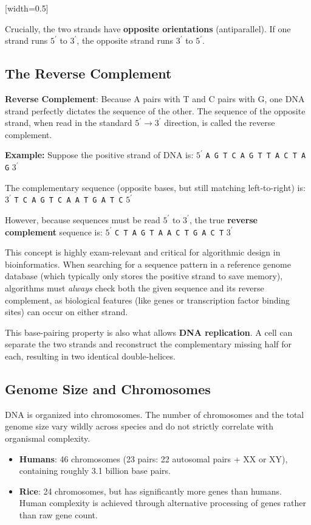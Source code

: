[width=0.5\textwidth]

Crucially, the two strands have \textbf{opposite orientations} (antiparallel). If one strand runs $5^{\prime}$ to $3^{\prime}$, the opposite strand runs $3^{\prime}$ to $5^{\prime}$. 

\subsection{The Reverse Complement}
\begin{important}
  \textbf{Reverse Complement}: Because A pairs with T and C pairs with G, one DNA strand perfectly dictates the sequence of the other. The sequence of the opposite strand, when read in the standard $5^{\prime} \to 3^{\prime}$ direction, is called the reverse complement.
\end{important}

\textbf{Example:}
Suppose the positive strand of DNA is:
$5^{\prime}$ \texttt{A G T C A G T T A C T A G} $3^{\prime}$

The complementary sequence (opposite bases, but still matching left-to-right) is:
$3^{\prime}$ \texttt{T C A G T C A A T G A T C} $5^{\prime}$

However, because sequences must be read $5^{\prime}$ to $3^{\prime}$, the true \textbf{reverse complement} sequence is:
$5^{\prime}$ \texttt{C T A G T A A C T G A C T} $3^{\prime}$

\sta This concept is highly exam-relevant and critical for algorithmic design in bioinformatics. When searching for a sequence pattern in a reference genome database (which typically only stores the positive strand to save memory), algorithms must \textit{always} check both the given sequence and its reverse complement, as biological features (like genes or transcription factor binding sites) can occur on either strand.

This base-pairing property is also what allows \textbf{DNA replication}. A cell can separate the two strands and reconstruct the complementary missing half for each, resulting in two identical double-helices.

\subsection{Genome Size and Chromosomes}
DNA is organized into chromosomes. The number of chromosomes and the total genome size vary wildly across species and do not strictly correlate with organismal complexity. 
\begin{itemize}
  \item \textbf{Humans}: 46 chromosomes (23 pairs: 22 autosomal pairs + XX or XY), containing roughly 3.1 billion base pairs.
  \item \textbf{Rice}: 24 chromosomes, but has significantly more genes than humans. Human complexity is achieved through alternative processing of genes rather than raw gene count.
\end{itemize}

